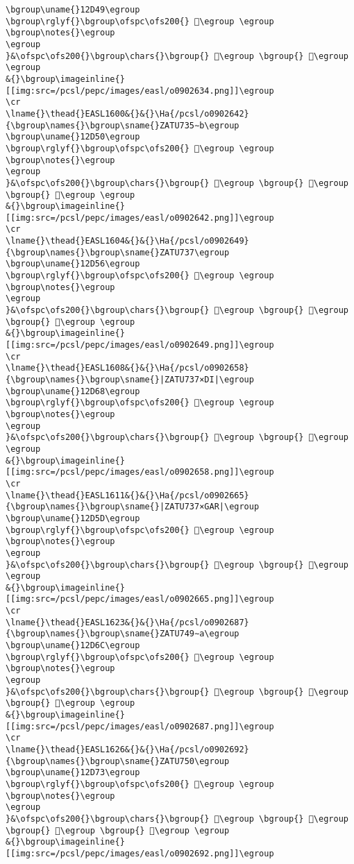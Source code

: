 \begin{verbatim}
\bgroup\uname{}12D49\egroup
\bgroup\rglyf{}\bgroup\ofspc\ofs200{} 𒵉\egroup \egroup
\bgroup\notes{}\egroup
\egroup
}&\ofspc\ofs200{}\bgroup\chars{}\bgroup{} 𒵉\egroup \bgroup{} 𒵊\egroup \egroup
&{}\bgroup\imageinline{}[[img:src=/pcsl/pepc/images/easl/o0902634.png]]\egroup
\cr
\lname{}\thead{}EASL1600&{}&{}\Ha{/pcsl/o0902642}{\bgroup\names{}\bgroup\sname{}ZATU735∼b\egroup
\bgroup\uname{}12D50\egroup
\bgroup\rglyf{}\bgroup\ofspc\ofs200{} 𒵐\egroup \egroup
\bgroup\notes{}\egroup
\egroup
}&\ofspc\ofs200{}\bgroup\chars{}\bgroup{} 𒵒\egroup \bgroup{} 𒵐\egroup \bgroup{} 𒵑\egroup \egroup
&{}\bgroup\imageinline{}[[img:src=/pcsl/pepc/images/easl/o0902642.png]]\egroup
\cr
\lname{}\thead{}EASL1604&{}&{}\Ha{/pcsl/o0902649}{\bgroup\names{}\bgroup\sname{}ZATU737\egroup
\bgroup\uname{}12D56\egroup
\bgroup\rglyf{}\bgroup\ofspc\ofs200{} 𒵖\egroup \egroup
\bgroup\notes{}\egroup
\egroup
}&\ofspc\ofs200{}\bgroup\chars{}\bgroup{} 𒵖\egroup \bgroup{} 𒵤\egroup \bgroup{} 𒵧\egroup \egroup
&{}\bgroup\imageinline{}[[img:src=/pcsl/pepc/images/easl/o0902649.png]]\egroup
\cr
\lname{}\thead{}EASL1608&{}&{}\Ha{/pcsl/o0902658}{\bgroup\names{}\bgroup\sname{}|ZATU737×DI|\egroup
\bgroup\uname{}12D68\egroup
\bgroup\rglyf{}\bgroup\ofspc\ofs200{} 𒵨\egroup \egroup
\bgroup\notes{}\egroup
\egroup
}&\ofspc\ofs200{}\bgroup\chars{}\bgroup{} 𒵚\egroup \bgroup{} 𒵨\egroup \egroup
&{}\bgroup\imageinline{}[[img:src=/pcsl/pepc/images/easl/o0902658.png]]\egroup
\cr
\lname{}\thead{}EASL1611&{}&{}\Ha{/pcsl/o0902665}{\bgroup\names{}\bgroup\sname{}|ZATU737×GAR|\egroup
\bgroup\uname{}12D5D\egroup
\bgroup\rglyf{}\bgroup\ofspc\ofs200{} 𒵝\egroup \egroup
\bgroup\notes{}\egroup
\egroup
}&\ofspc\ofs200{}\bgroup\chars{}\bgroup{} 𒵝\egroup \bgroup{} 𒵦\egroup \egroup
&{}\bgroup\imageinline{}[[img:src=/pcsl/pepc/images/easl/o0902665.png]]\egroup
\cr
\lname{}\thead{}EASL1623&{}&{}\Ha{/pcsl/o0902687}{\bgroup\names{}\bgroup\sname{}ZATU749∼a\egroup
\bgroup\uname{}12D6C\egroup
\bgroup\rglyf{}\bgroup\ofspc\ofs200{} 𒵬\egroup \egroup
\bgroup\notes{}\egroup
\egroup
}&\ofspc\ofs200{}\bgroup\chars{}\bgroup{} 𒵬\egroup \bgroup{} 𒵭\egroup \bgroup{} 𒵮\egroup \egroup
&{}\bgroup\imageinline{}[[img:src=/pcsl/pepc/images/easl/o0902687.png]]\egroup
\cr
\lname{}\thead{}EASL1626&{}&{}\Ha{/pcsl/o0902692}{\bgroup\names{}\bgroup\sname{}ZATU750\egroup
\bgroup\uname{}12D73\egroup
\bgroup\rglyf{}\bgroup\ofspc\ofs200{} 𒵳\egroup \egroup
\bgroup\notes{}\egroup
\egroup
}&\ofspc\ofs200{}\bgroup\chars{}\bgroup{} 𒵱\egroup \bgroup{} 𒵲\egroup \bgroup{} 𒵳\egroup \bgroup{} 𒵴\egroup \egroup
&{}\bgroup\imageinline{}[[img:src=/pcsl/pepc/images/easl/o0902692.png]]\egroup

\end{verbatim}
